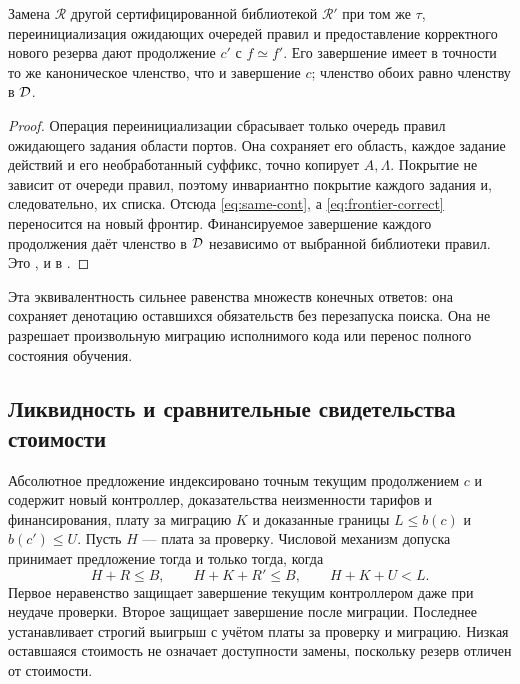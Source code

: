 \begin{theorem}\label{thm:rebase}
Замена $\mathcal R$ другой сертифицированной библиотекой $\mathcal R'$ при том же $\tau$, переинициализация ожидающих очередей правил и предоставление корректного нового резерва дают продолжение $c'$ с $f\simeq f'$. Его завершение имеет в точности то же каноническое членство, что и завершение $c$; членство обоих равно членству в $\mathcal D$.
\end{theorem}
\begin{proof}
Операция переинициализации сбрасывает только очередь правил ожидающего задания области портов. Она сохраняет его область, каждое задание действий и его необработанный суффикс, точно копирует $A,\Lambda$. Покрытие не зависит от очереди правил, поэтому инвариантно покрытие каждого задания и, следовательно, их списка. Отсюда \eqref{eq:same-cont}, а \eqref{eq:frontier-correct} переносится на новый фронтир. Финансируемое завершение каждого продолжения даёт членство в $\mathcal D$ независимо от выбранной библиотеки правил. Это ,  и  в .
\end{proof}
Эта эквивалентность сильнее равенства множеств конечных ответов: она сохраняет денотацию оставшихся обязательств без перезапуска поиска. Она не разрешает произвольную миграцию исполнимого кода или перенос полного состояния обучения.

\subsection{Ликвидность и сравнительные свидетельства стоимости}
Абсолютное предложение индексировано точным текущим продолжением $c$ и содержит новый контроллер, доказательства неизменности тарифов и финансирования, плату за миграцию $K$ и доказанные границы $L\le b(c)$ и $b(c')\le U$. Пусть $H$ --- плата за проверку. Числовой механизм допуска принимает предложение тогда и только тогда, когда
\begin{equation}\label{eq:absolute-gate}
 H+R\le B,\qquad H+K+R'\le B,\qquad H+K+U<L.
\end{equation}
Первое неравенство защищает завершение текущим контроллером даже при неудаче проверки. Второе защищает завершение после миграции. Последнее устанавливает строгий выигрыш с учётом платы за проверку и миграцию. Низкая оставшаяся стоимость не означает доступности замены, поскольку резерв отличен от стоимости.

